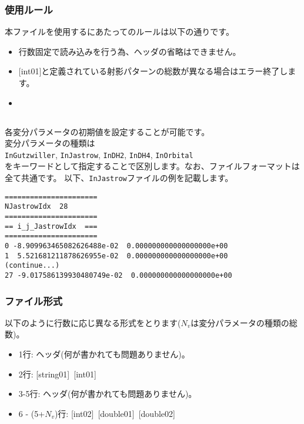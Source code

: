 \subsubsection{使用ルール}
本ファイルを使用するにあたってのルールは以下の通りです。
\begin{itemize}
\item 行数固定で読み込みを行う為、ヘッダの省略はできません。
\item $[$int01$]$と定義されている射影パターンの総数が異なる場合はエラー終了します。
\item {}
\end{itemize}

\newpage
\subsection{}
\label{Subsec:InputParam}
各変分パラメータの初期値を設定することが可能です。\\
変分パラメータの種類は\\
\verb|InGutzwiller|, \verb|InJastrow|, \verb|InDH2|, \verb|InDH4|, \verb|InOrbital|\\
をキーワードとして指定することで区別します。なお、ファイルフォーマットは全て共通です。
以下、\verb|InJastrow|ファイルの例を記載します。

\begin{minipage}{12.5cm}
\begin{screen}
\begin{verbatim}
======================
NJastrowIdx  28
====================== 
== i_j_JastrowIdx  ===
====================== 
0 -8.909963465082626488e-02  0.000000000000000000e+00
1  5.521681211878626955e-02  0.000000000000000000e+00
(continue...)
27 -9.017586139930480749e-02  0.000000000000000000e+00
\end{verbatim}
\end{screen}
\end{minipage}

\subsubsection{ファイル形式}
以下のように行数に応じ異なる形式をとります($N_v$は変分パラメータの種類の総数)。
 \begin{itemize}
   \item  1行:  ヘッダ(何が書かれても問題ありません)。
   \item  2行:   [string01]~[int01]
   \item  3-5行:  ヘッダ(何が書かれても問題ありません)。
   \item  6 - (5+$N_v$)行: [int02]~[double01]~[double02]
  \end{itemize}
